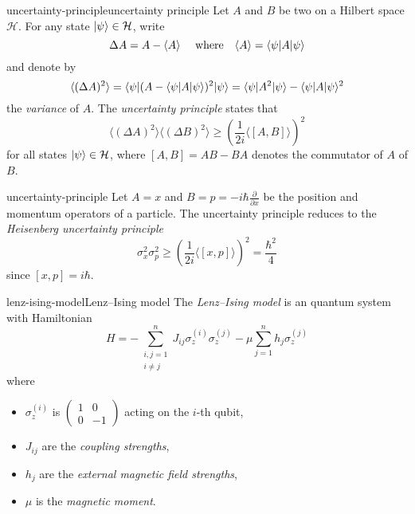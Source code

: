 \begin{topic}{uncertainty-principle}{uncertainty principle}
    Let $A$ and $B$ be two  on a Hilbert space $\mathcal{H}$. For any state $|\psi\rangle \in \mathcal{H}$, write
    \[ \Delta A = A - \langle A \rangle \quad \textup{ where} \quad \langle A \rangle = \langle\psi| A |\psi\rangle \]
    and denote by
    \[ \langle (\Delta A)^2 \rangle = \langle\psi| (A - \langle\psi| A |\psi\rangle)^2 |\psi\rangle = \langle\psi| A^2 |\psi\rangle - \langle\psi| A |\psi\rangle^2 \]
    the \textit{variance} of $A$. The \emph{uncertainty principle} states that
    \[ \langle (\Delta A)^2 \rangle \langle (\Delta B)^2 \rangle \ge \left(\frac{1}{2 i} \langle [A, B] \rangle \right)^2 \]
    for all states $|\psi\rangle \in \mathcal{H}$, where $[A, B] = AB - BA$ denotes the commutator of $A$ of $B$.
\end{topic}

\begin{example}{uncertainty-principle}
    Let $A = x$ and $B = p = - i \hbar \tfrac{\partial}{\partial x}$ be the position and momentum operators of a particle. The uncertainty principle reduces to the \textit{Heisenberg uncertainty principle}
    \[ \sigma_x^2 \sigma_p^2 \ge \left(\frac{1}{2 i} \langle [x, p] \rangle \right)^2 = \frac{\hbar^2}{4} \]
    since $[x, p] = i \hbar$.
\end{example}

\begin{topic}{lenz-ising-model}{Lenz--Ising model}
    The \emph{Lenz--Ising model} is an  quantum system with Hamiltonian
    \[ H = - \sum_{\substack{i, j = 1 \\ i \ne j}}^{n} J_{ij} \sigma_z^{(i)} \sigma_z^{(j)} - \mu \sum_{j = 1}^{n} h_j \sigma_z^{(j)} \]
    where
    \begin{itemize}
        \item $\sigma_z^{(i)}$ is $\left(\begin{smallmatrix} 1 & 0 \\ 0 & -1 \end{smallmatrix}\right)$ acting on the $i$-th qubit,
        \item $J_{ij}$ are the \textit{coupling strengths},
        \item $h_j$ are the \textit{external magnetic field strengths},
        \item $\mu$ is the \textit{magnetic moment}.
    \end{itemize}
\end{topic}

